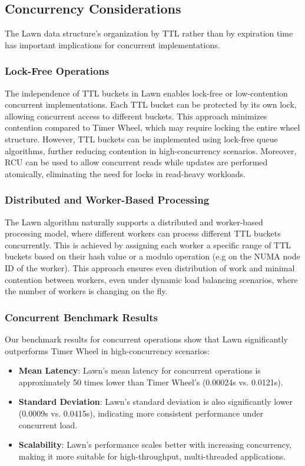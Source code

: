 \documentclass[conference]{IEEEtran}
\begin{document}
\subsection{Concurrency Considerations}
The Lawn data structure's organization by TTL rather than by expiration time has important implications for concurrent implementations.

\subsubsection{Lock-Free Operations}
The independence of TTL buckets in Lawn enables lock-free or low-contention concurrent implementations. Each TTL bucket can be protected by its own lock, allowing concurrent access to different buckets. This approach minimizes contention compared to Timer Wheel, which may require locking the entire wheel structure. However, TTL buckets can be implemented using lock-free queue algorithms, further reducing contention in high-concurrency scenarios. Moreover, RCU can be used to allow concurrent reads while updates are performed atomically, eliminating the need for locks in read-heavy workloads.

\subsubsection{Distributed and Worker-Based Processing}
The Lawn algorithm naturally supports a distributed and worker-based processing model, where different workers can process different TTL buckets concurrently. This is achieved by assigning each worker a specific range of TTL buckets based on their hash value or a modulo operation (e.g on the NUMA node ID of the worker). This approach ensures even distribution of work and minimal contention between workers, even under dynamic load balancing scenarios, where the number of workers is changing on the fly.  

\subsubsection{Concurrent Benchmark Results}
Our benchmark results for concurrent operations show that Lawn significantly outperforms Timer Wheel in high-concurrency scenarios:

\begin{itemize}
    \item \textbf{Mean Latency}: Lawn's mean latency for concurrent operations is approximately 50 times lower than Timer Wheel's (0.00024s vs. 0.0121s).
    
    \item \textbf{Standard Deviation}: Lawn's standard deviation is also significantly lower (0.0009s vs. 0.0415s), indicating more consistent performance under concurrent load.
    
    \item \textbf{Scalability}: Lawn's performance scales better with increasing concurrency, making it more suitable for high-throughput, multi-threaded applications.
\end{itemize}
\end{document}
